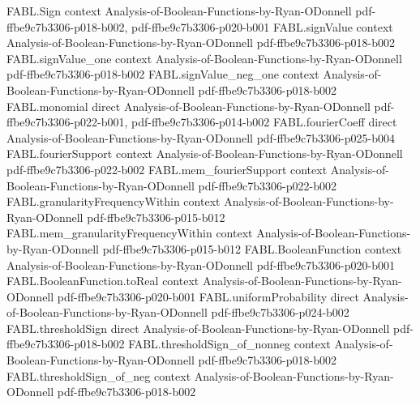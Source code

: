 \begin{theorem}
\label{FABL.totalInfluence_majority_odd}
\leanok
{}
\proofstep
  {FABL.Sign}
  {context}
  {Analysis-of-Boolean-Functions-by-Ryan-ODonnell}
  {pdf-ffbe9c7b3306-p018-b002,
    pdf-ffbe9c7b3306-p020-b001}
\proofstep
  {FABL.signValue}
  {context}
  {Analysis-of-Boolean-Functions-by-Ryan-ODonnell}
  {pdf-ffbe9c7b3306-p018-b002}
\proofstep
  {FABL.signValue_one}
  {context}
  {Analysis-of-Boolean-Functions-by-Ryan-ODonnell}
  {pdf-ffbe9c7b3306-p018-b002}
\proofstep
  {FABL.signValue_neg_one}
  {context}
  {Analysis-of-Boolean-Functions-by-Ryan-ODonnell}
  {pdf-ffbe9c7b3306-p018-b002}
\proofstep
  {FABL.monomial}
  {direct}
  {Analysis-of-Boolean-Functions-by-Ryan-ODonnell}
  {pdf-ffbe9c7b3306-p022-b001,
    pdf-ffbe9c7b3306-p014-b002}
\proofstep
  {FABL.fourierCoeff}
  {direct}
  {Analysis-of-Boolean-Functions-by-Ryan-ODonnell}
  {pdf-ffbe9c7b3306-p025-b004}
\proofstep
  {FABL.fourierSupport}
  {context}
  {Analysis-of-Boolean-Functions-by-Ryan-ODonnell}
  {pdf-ffbe9c7b3306-p022-b002}
\proofstep
  {FABL.mem_fourierSupport}
  {context}
  {Analysis-of-Boolean-Functions-by-Ryan-ODonnell}
  {pdf-ffbe9c7b3306-p022-b002}
\proofstep
  {FABL.granularityFrequencyWithin}
  {context}
  {Analysis-of-Boolean-Functions-by-Ryan-ODonnell}
  {pdf-ffbe9c7b3306-p015-b012}
\proofstep
  {FABL.mem_granularityFrequencyWithin}
  {context}
  {Analysis-of-Boolean-Functions-by-Ryan-ODonnell}
  {pdf-ffbe9c7b3306-p015-b012}
\proofstep
  {FABL.BooleanFunction}
  {context}
  {Analysis-of-Boolean-Functions-by-Ryan-ODonnell}
  {pdf-ffbe9c7b3306-p020-b001}
\proofstep
  {FABL.BooleanFunction.toReal}
  {context}
  {Analysis-of-Boolean-Functions-by-Ryan-ODonnell}
  {pdf-ffbe9c7b3306-p020-b001}
\proofstep
  {FABL.uniformProbability}
  {direct}
  {Analysis-of-Boolean-Functions-by-Ryan-ODonnell}
  {pdf-ffbe9c7b3306-p024-b002}
\proofstep
  {FABL.thresholdSign}
  {direct}
  {Analysis-of-Boolean-Functions-by-Ryan-ODonnell}
  {pdf-ffbe9c7b3306-p018-b002}
\proofstep
  {FABL.thresholdSign_of_nonneg}
  {context}
  {Analysis-of-Boolean-Functions-by-Ryan-ODonnell}
  {pdf-ffbe9c7b3306-p018-b002}
\proofstep
  {FABL.thresholdSign_of_neg}
  {context}
  {Analysis-of-Boolean-Functions-by-Ryan-ODonnell}
  {pdf-ffbe9c7b3306-p018-b002}

\end{theorem}
